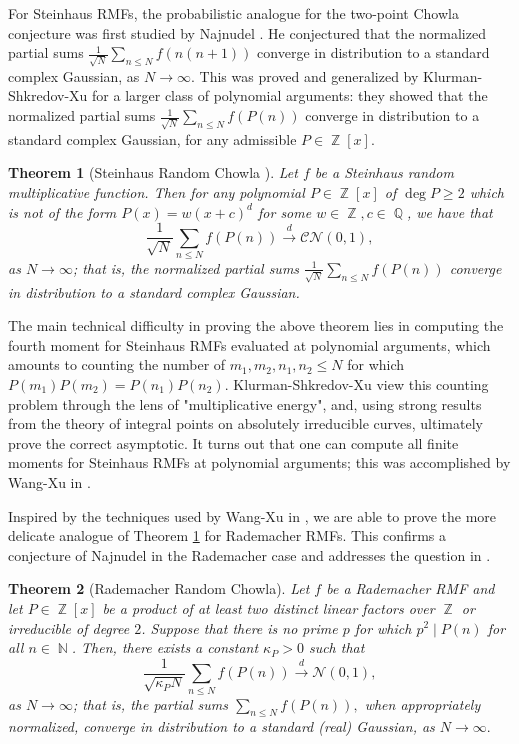 \documentclass[11pts]{amsart}
\numberwithin{equation}{section}
\newtheorem{thm}{Theorem}[section]
\DeclareMathOperator{\Q}{\mathbb{Q}}
\DeclareMathOperator{\Z}{\mathbb{Z}}
\DeclareMathOperator{\N}{\mathbb{N}}
\begin{document}
For Steinhaus RMFs, the probabilistic analogue for the two-point Chowla conjecture was first studied by Najnudel \cite{Najnudel_Chowla}. He conjectured that the normalized partial sums $\frac{1}{\sqrt{N}}\sum_{n\leq N}f(n(n+1))$ converge in distribution to a standard complex Gaussian, as $N\rightarrow \infty$. This was proved and generalized by Klurman-Shkredov-Xu \cite{Oleksiy-RandomChowla} for a larger class of polynomial arguments: they showed that the normalized partial sums $\frac{1}{\sqrt{N}}\sum_{n\leq N}f(P(n))$ converge in distribution to a standard complex Gaussian, for any admissible $P\in \Z[x]$.

\begin{thm}[Steinhaus Random Chowla \cite{Oleksiy-RandomChowla}]
\label{Steinhaus-RC}
    Let $f$ be a Steinhaus random multiplicative function. Then for any polynomial $P\in\Z[x]$ of $\deg P \geq 2$ which is not of the form $P(x) = w(x + c)^d$ for some $w \in \Z, c \in \Q$, we have that
    \[
    \frac{1}{\sqrt{N}}\sum_{n\leq N}f(P(n)) \xrightarrow{d} \mathcal{CN}(0,1),
    \]
    as $N\rightarrow\infty$; that is, the normalized partial sums $\frac{1}{\sqrt{N}}\sum_{n\leq N}f(P(n))$ converge in distribution to a standard complex Gaussian.
\end{thm}

The main technical difficulty in proving the above theorem lies in computing the fourth moment for Steinhaus RMFs evaluated at polynomial arguments, which amounts to counting the number of $m_1,m_2,n_1,n_2\leq N$ for which $P(m_1)P(m_2)=P(n_1)P(n_2)$.  
Klurman-Shkredov-Xu \cite[Theorem 3.2]{Oleksiy-RandomChowla} view this counting problem through the lens of "multiplicative energy", 
and, using strong results from the theory of integral points on absolutely irreducible curves, ultimately prove the correct asymptotic. It turns out that one can compute all finite moments for Steinhaus RMFs at polynomial arguments; this was accomplished by Wang-Xu in \cite{Wang-Xu}. 

Inspired by the techniques used by Wang-Xu in \cite{Wang-Xu}, we are able to prove the more delicate analogue of Theorem \ref{Steinhaus-RC} for Rademacher RMFs. This confirms a conjecture of Najnudel \cite{Najnudel_Chowla} in the Rademacher case 
and addresses the question in \cite[Section 1.4]{Oleksiy-RandomChowla}.

\begin{thm}[Rademacher Random Chowla]
    \label{main_thm}
    Let $f$ be a Rademacher RMF and let $P\in \Z[x]$ be a product of at least two distinct linear factors over $\Z$ or irreducible of degree $2$. Suppose that there is no prime $p$ for which $p^2 \mid P(n)$ for all $n\in \N$. Then, there exists a constant $\kappa_P>0$ such that
    \[
    \frac{1}{\sqrt{\kappa_P N}}\sum_{n\leq N}f(P(n))\xrightarrow{d}\mathcal{N}(0,1),
    \]
    as $N\rightarrow\infty$; that is, the partial sums $\sum_{n\leq N}f(P(n)),$ when appropriately normalized, converge in distribution to a standard (real) Gaussian, as $N\rightarrow\infty.$
\end{thm}
\end{document}
